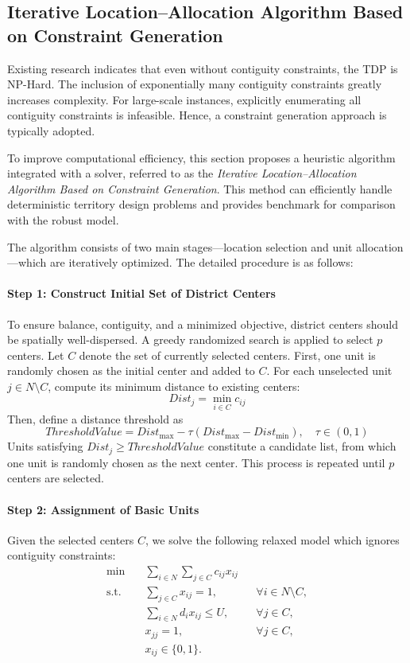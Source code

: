 \documentclass[preprint,12pt,authoryear]{elsarticle}
\begin{document}
\subsection{Iterative Location–Allocation Algorithm Based on Constraint Generation}
\label{3.4}

Existing research indicates that even without contiguity constraints, the TDP is NP-Hard. 
The inclusion of exponentially many contiguity constraints greatly increases complexity. 
For large-scale instances, explicitly enumerating all contiguity constraints is infeasible. 
Hence, a constraint generation approach is typically adopted.

To improve computational efficiency, this section proposes a heuristic algorithm integrated with a solver, referred to as the \textit{Iterative Location–Allocation Algorithm Based on Constraint Generation}. 
This method can efficiently handle deterministic territory design problems and provides benchmark for comparison with the robust model.

The algorithm consists of two main stages—location selection and unit allocation—which are iteratively optimized. The detailed procedure is as follows:

\paragraph{Step 1: Construct Initial Set of District Centers}

To ensure balance, contiguity, and a minimized objective, district centers should be spatially well-dispersed. A greedy randomized search is applied to select \( p \) centers. Let \( C \) denote the set of currently selected centers. First, one unit is randomly chosen as the initial center and added to \( C \). For each unselected unit \( j \in N \setminus C \), compute its minimum distance to existing centers:
\[
Dist_j = \min_{i \in C} c_{ij}
\]
Then, define a distance threshold as
\[
ThresholdValue = Dist_{\max} - \tau (Dist_{\max} - Dist_{\min}), \quad \tau \in (0,1)
\]
Units satisfying \( Dist_j \geqslant ThresholdValue \) constitute a candidate list, from which one unit is randomly chosen as the next center. This process is repeated until \( p \) centers are selected.


\paragraph{Step 2: Assignment of Basic Units}

Given the selected centers \( C \), we solve the following relaxed model which ignores contiguity constraints:
\begin{align}
\min \quad & \sum_{i\in N}\sum_{j\in C} c_{ij}x_{ij} \\
\text{s.t.} \quad & \sum_{j\in C} x_{ij} = 1, && \forall i\in N\setminus C, \\
& \sum_{i\in N} d_i x_{ij} \leqslant U, && \forall j\in C, \\
& x_{jj} = 1, && \forall j\in C, \\
& x_{ij} \in \{0,1\}.
\end{align}
\end{document}
